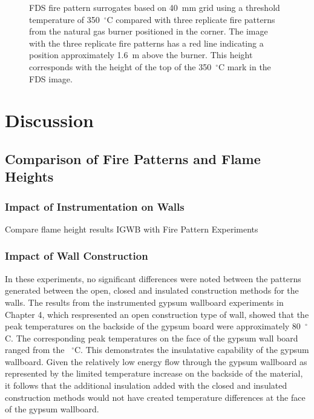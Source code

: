 \documentclass[twoside]{uocthesis}
\begin{document}
{\begin{figure}[h]
  \caption[FDS fire pattern surrogates based on 40~mm grid using a threshold temperature of 350~$^\circ$C compared with three replicate fire patterns from the natural gas burner positioned in the corner]{FDS fire pattern surrogates based on 40~mm grid using a threshold temperature of 350~$^\circ$C compared with three replicate fire patterns from the natural gas burner positioned in the corner.  The image with the three replicate fire patterns has a red line indicating a position approximately 1.6~m above the burner.  This height corresponds with the height of the top of the 350~$^\circ$C mark in the FDS image.}
  \label{FDS_FirePattern_comp}
\end{figure}



\chapter{Discussion}

\section{Comparison of Fire Patterns and Flame Heights}

\subsection{Impact of Instrumentation on Walls}

Compare flame height results IGWB with Fire Pattern Experiments

\subsection{Impact of Wall Construction}

In these experiments, no significant differences were noted between the patterns generated between the open, closed and insulated construction methods for the walls.  The results from the instrumented gypsum wallboard experiments in Chapter 4, which respresented an open construction type of wall, showed that the peak temperatures on the backside of the gypsum board were approximately 80~$^\circ$C.  The corresponding peak temperatures on the face of the gypsum wall board ranged from the    ~$^\circ$C.  This demonstrates the insulatative capability of the gypsum wallboard. Given the relatively low energy flow through the gypsum wallboard as represented by the limited temperature increase on the backside of the material, it follows that the additional insulation added with the closed and insulated construction methods would not have created temperature differences at the face of the gypsum wallboard.  

}
\end{document}
